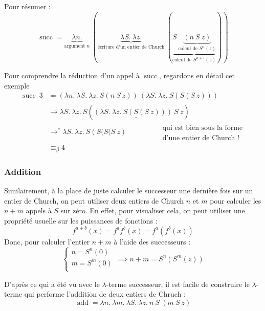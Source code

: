 \documentclass[11pt]{article}
\begin{document}
Pour résumer :
$$\operatorname{succ} = \underbrace{\lambda n.}_\text{argument $n$}~\left(\underbrace{\lambda S.~\lambda z.}_\text{écriture d'un entier de Church}~\left(
    \underbrace{S~\underbrace{(n~S~z)}_\text{calcul de $S^n(z)$}}_\text{calcul de $S^{n+1}(z)$}
\right)\right)$$

\begin{example}
    Pour comprendre la réduction d'un appel à $\operatorname{succ}$, regardons en détail cet exemple
    \begin{equation*}
    \begin{aligned}
        \operatorname{succ}~3 &= \underline{\left(\lambda n.~\lambda S.~\lambda z.~S \left(n~S~z\right)\right)~\left(\lambda S.~\lambda z.~ S(S(S~z))\right)}\\
        &\longrightarrow \lambda S.~\lambda z.~S \left(\underline{\underline{\left(\lambda S.~\lambda z.~ S(S(S~z))\right)~S}~z}\right)\\
        &\longrightarrow^* \lambda S.~\lambda z.~S\left(S(S(S~z\right)~~~~~~~~~~~~~~~~~~~~~\substack{\text{qui est bien sous la forme}\\\text{d'une entier de Church !}}\\
        &\equiv_\beta 4
    \end{aligned}
    \end{equation*}
\end{example}

\subsubsection{Addition}
Similairement, à la place de juste calculer le successeur une dernière fois sur un entier de Church, on peut utiliser deux entiers de Church $n$ et $m$ pour calculer les $n+m$ appels à $S$ sur zéro. En effet, pour visualiser cela, on peut utiliser une propriété usuelle sur les puissances de fonctions :
$$f^{a+b}(x)=f^a f^b (x)=f^a(f^b(x))$$
Donc, pour calculer l'entier $n + m$ à l'aide des successeurs :
$$\begin{cases}
    n = S^{n}(0)\\
    m = S^{m}(0)\\
\end{cases}\implies n + m = S^{n}(S^{m}(z))$$

D'après ce qui a été vu avec le $\lambda$-terme successeur, il est facile de construire le $\lambda$-terme qui performe l'addition de deux entiers de Chruch :
$$\operatorname{add} = \lambda n.~\lambda m.~\lambda S.~\lambda z. ~ n~S~(m~S~z)$$
\end{document}
